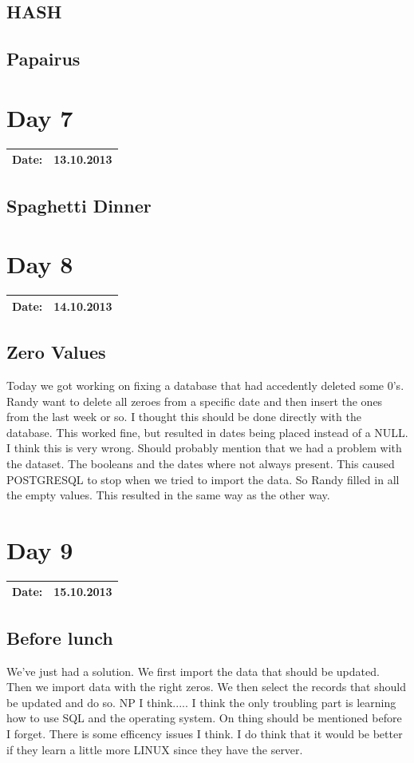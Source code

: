 \subsection{HASH}
\subsection{Papairus}
\section{Day 7}
\begin{tabular}{|c|c|}
\hline
Date: & 13.10.2013 \\
\hline
\end{tabular}
\subsection{Spaghetti Dinner}
\section{Day 8}
\begin{tabular}{|c|c|}
\hline
Date: & 14.10.2013 \\
\hline
\end{tabular}
\subsection{Zero Values}
Today we got working on fixing  a database that had accedently deleted some 0's. Randy want to delete all zeroes from a specific date and then insert the ones from the last week or so. I thought this should be done directly with the database. This worked fine, but resulted in dates being placed instead of a NULL. I think this is very wrong. Should probably mention that we had a problem with the dataset. The booleans and the dates where not always present. This caused POSTGRESQL to stop when we tried to import the data. So Randy filled in all the empty values. This resulted in the same way as the other way.
\section{Day 9}
\begin{tabular}{|c|c|}
\hline
Date: & 15.10.2013 \\
\hline
\end{tabular}
\subsection{Before lunch}
We've just had a solution. We first import the data that should be updated. Then we import data with the right zeros. We then select the records that should be updated and do so. NP I think..... I think the only troubling part is learning how to use SQL and the operating system. On thing should be mentioned before I forget. There is some efficency issues I think. I do think that it would be better if they learn a little more LINUX since they have the server.
